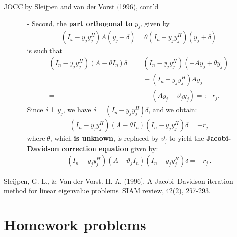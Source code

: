 \documentclass[t,usepdftitle=false]{beamer}
\begin{document}
\begin{frame}{JOCC by Sleijpen and van der Vorst (1996), cont'd}
\begin{itemize}
\item[]
\begin{itemize}\normalsize
\item[-] Second, the \textbf{part orthogonal to} $y_j$, given by
\begin{align*}
(I_n-y_jy_j^H)A(y_j+\delta)=\theta (I_n-y_jy_j^H)(y_j+\delta)
\end{align*}
is such that 
\begin{align*}
(I_n-y_jy_j^H)(A-\theta I_n)\delta
=&\,(I_n-y_jy_j^H)(-Ay_j+\theta y_j)\\
=&\,-(I_n-y_jy_j^H)Ay_j\\
=&\,-(Ay_j-\vartheta_jy_j)=:-r_j.
\end{align*}
Since $\delta\perp y_j$, we have $\delta=(I_n-y_jy_j^H)\delta$, and we obtain:
\begin{align*}
(I_n-y_jy_j^H)(A-\theta I_n)(I_n-y_jy_j^H)\delta=-r_j
\end{align*}
where $\theta$, which \textbf{is unknown}, is replaced by $\vartheta_j$ to yield the \textbf{Jacobi-Davidson correction equation} given by:
\begin{align*}
\boxed{
(I_n-y_jy_j^H)(A-\vartheta_j I_n)(I_n-y_jy_j^H)\delta=-r_j
}\,.
\end{align*}

\end{itemize}
\end{itemize}\smallskip
\tiny{Sleijpen, G. L., \& Van der Vorst, H. A. (1996). A Jacobi--Davidson iteration method for linear eigenvalue problems. SIAM review, 42(2), 267-293.}
\end{frame}




\section{Homework problems}
\end{document}
